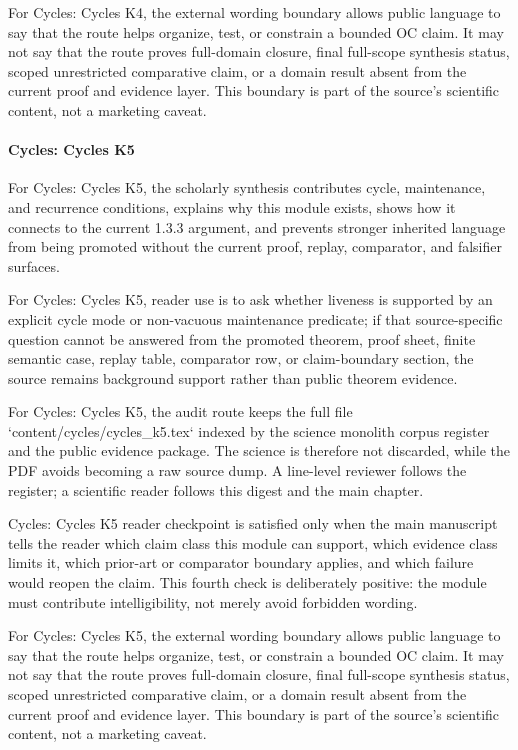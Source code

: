 For Cycles: Cycles K4, the external wording boundary allows public language to say that the route helps organize, test, or constrain a bounded OC claim. It may not say that the route proves full-domain closure, final full-scope synthesis status, scoped unrestricted comparative claim, or a domain result absent from the current proof and evidence layer. This boundary is part of the source's scientific content, not a marketing caveat.


\paragraph{Cycles: Cycles K5}

For Cycles: Cycles K5, the scholarly synthesis contributes cycle, maintenance, and recurrence conditions, explains why this module exists, shows how it connects to the current 1.3.3 argument, and prevents stronger inherited language from being promoted without the current proof, replay, comparator, and falsifier surfaces.


For Cycles: Cycles K5, reader use is to ask whether liveness is supported by an explicit cycle mode or non-vacuous maintenance predicate; if that source-specific question cannot be answered from the promoted theorem, proof sheet, finite semantic case, replay table, comparator row, or claim-boundary section, the source remains background support rather than public theorem evidence.


For Cycles: Cycles K5, the audit route keeps the full file `content/cycles/cycles\_k5.tex` indexed by the science monolith corpus register and the public evidence package. The science is therefore not discarded, while the PDF avoids becoming a raw source dump. A line-level reviewer follows the register; a scientific reader follows this digest and the main chapter.


Cycles: Cycles K5 reader checkpoint is satisfied only when the main manuscript tells the reader which claim class this module can support, which evidence class limits it, which prior-art or comparator boundary applies, and which failure would reopen the claim. This fourth check is deliberately positive: the module must contribute intelligibility, not merely avoid forbidden wording.


For Cycles: Cycles K5, the external wording boundary allows public language to say that the route helps organize, test, or constrain a bounded OC claim. It may not say that the route proves full-domain closure, final full-scope synthesis status, scoped unrestricted comparative claim, or a domain result absent from the current proof and evidence layer. This boundary is part of the source's scientific content, not a marketing caveat.


